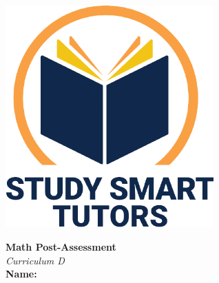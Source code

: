 \documentclass[12pt]{article}
\begin{document}


\newpage
\thispagestyle{empty}
\vspace*{\fill}

\vspace*{10cm}




\newpage





\thispagestyle{empty}

\vspace*{\fill}

\vspace*{3cm}

\begin{center}

    \includegraphics[width=0.6\textwidth]{SST_Color_Logo.png} %
    
    \vspace{2cm} %
    

    
   \Huge \textbf{ Math Post-Assessment}\\
    \LARGE \textit{Curriculum D}\\  
    [2cm]

    \LARGE \textbf{Name:} \underline{\hspace{8cm}}
   
    
    \vfill %
    
\end{center}
\end{document}
